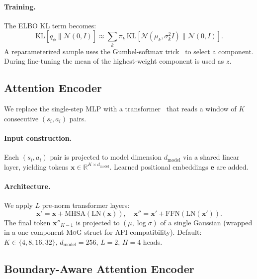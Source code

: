 \documentclass{article}
\begin{document}
\paragraph{Training.}
The ELBO KL term becomes:
\begin{equation}
    \mathrm{KL}[q_\phi \| \mathcal{N}(0,I)]
    \approx \sum_k \pi_k \,
    \mathrm{KL}[\mathcal{N}(\mu_k,\sigma_k^2 I)\|\mathcal{N}(0,I)].
    \label{eq:mogkl}
\end{equation}
A reparameterized sample uses the Gumbel-softmax
trick~\cite{bengio2013estimating} to select a component.
During fine-tuning the mean of the highest-weight component
is used as $z$.

\subsection{Attention Encoder}
\label{sec:attention}

We replace the single-step MLP with a transformer~\cite{vaswani2017attention}
that reads a window of $K$ consecutive $(s_i,a_i)$ pairs.

\paragraph{Input construction.}
Each $(s_i,a_i)$ pair is projected to model dimension
$d_\text{model}$ via a shared linear layer, yielding tokens
$\mathbf{x} \in \mathbb{R}^{K \times d_\text{model}}$.
Learned positional embeddings $\mathbf{e}$ are added.

\paragraph{Architecture.}
We apply $L$ pre-norm transformer layers:
\begin{equation}
\mathbf{x}' = \mathbf{x} + \mathrm{MHSA}(\mathrm{LN}(\mathbf{x})),
\quad
\mathbf{x}'' = \mathbf{x}' + \mathrm{FFN}(\mathrm{LN}(\mathbf{x}')).
\end{equation}
The final token $\mathbf{x}''_{K-1}$ is projected to
$(\mu,\log\sigma)$ of a single Gaussian (wrapped in a
one-component \textsc{MoG} struct for API compatibility).
Default: $K\in\{4,8,16,32\}$, $d_\text{model}=256$,
$L=2$, $H=4$ heads.

\subsection{Boundary-Aware Attention Encoder}
\label{sec:boundary}
\end{document}
